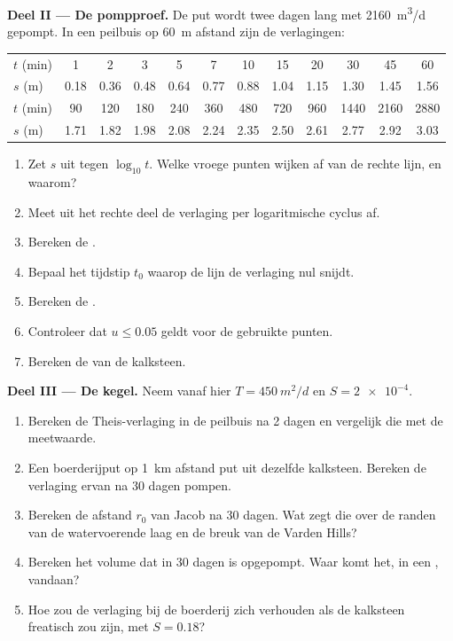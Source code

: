 \begin{problem}
\medskip\noindent\textbf{Deel II --- De pompproef.} De put wordt
twee dagen lang met \qty{2160}{m^3/d} gepompt. In een peilbuis op \qty{60}{m}
afstand zijn de verlagingen:
\begin{center}
\begin{tabular}{l*{11}{c}}
\hline
$t$ (\unit{min}) & 1 & 2 & 3 & 5 & 7 & 10 & 15 & 20 & 30 & 45 & 60\\
$s$ (\unit{m}) & 0.18 & 0.36 & 0.48 & 0.64 & 0.77 & 0.88 & 1.04 & 1.15 & 1.30 & 1.45 & 1.56\\
\hline
$t$ (\unit{min}) & 90 & 120 & 180 & 240 & 360 & 480 & 720 & 960 & 1440 & 2160 & 2880\\
$s$ (\unit{m}) & 1.71 & 1.82 & 1.98 & 2.08 & 2.24 & 2.35 & 2.50 & 2.61 & 2.77 & 2.92 & 3.03\\
\hline
\end{tabular}
\end{center}
\begin{enumerate}[resume]
\item Zet $s$ uit tegen $\log_{10}t$. Welke vroege punten wijken af van de rechte
  lijn, en waarom?
\item Meet uit het rechte deel de verlaging per logaritmische cyclus af.
\item Bereken de .
\item Bepaal het tijdstip $t_0$ waarop de lijn de verlaging nul snijdt.
\item Bereken de .
\item Controleer dat $u \le 0.05$ geldt voor de gebruikte punten.
\item Bereken de  van de kalksteen.
\end{enumerate}

\medskip\noindent\textbf{Deel III --- De kegel.} Neem vanaf hier $T =
\qty{450}{m^2/d}$ en $S = \num{2e-4}$.
\begin{enumerate}[resume]
\item Bereken de Theis-verlaging in de peilbuis na 2 dagen en
  vergelijk die met de meetwaarde.
\item Een boerderijput op \qty{1}{km} afstand put uit dezelfde kalksteen. Bereken
  de verlaging ervan na 30 dagen pompen.
\item Bereken de afstand $r_0$ van Jacob na 30 dagen. Wat zegt die over
  de randen van de watervoerende laag en de breuk van de Varden Hills?
\item Bereken het volume dat in 30 dagen is opgepompt. Waar komt het, in een ,
  vandaan?
\item Hoe zou de verlaging bij de boerderij zich verhouden als de kalksteen
  freatisch zou zijn, met $S = 0.18$?
\end{enumerate}


\end{problem}
